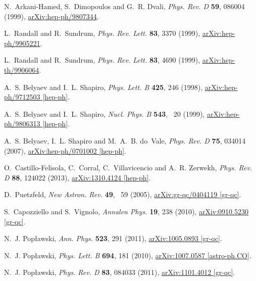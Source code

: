\documentclass{ws-mpla}
\renewcommand{\(}{\left(}
\renewcommand{\)}{\right)}
\renewcommand{\[}{\left[}
\renewcommand{\]}{\right]}
\begin{document}
\begin{thebibliography}{10}
N.~Arkani-Hamed, S.~Dimopoulos and G.~R. Dvali, {\em Phys. Rev. D} {\bf 59},
  086004  (1999), \href{http://arxiv.org/abs/hep-ph/9807344}{{\ttfamily
  arXiv:hep-ph/9807344}}.

L.~Randall and R.~Sundrum, {\em Phys. Rev. Lett.} {\bf 83},   3370  (1999),
  \href{http://arxiv.org/abs/hep-ph/9905221}{{\ttfamily arXiv:hep-ph/9905221}}.

L.~Randall and R.~Sundrum, {\em Phys. Rev. Lett.} {\bf 83},   4690  (1999),
  \href{http://arxiv.org/abs/hep-th/9906064}{{\ttfamily arXiv:hep-th/9906064}}.

A.~S. Belyaev and I.~L. Shapiro, {\em Phys. Lett. B} {\bf 425},   246  (1998),
  \href{http://arxiv.org/abs/hep-ph/9712503}{{\ttfamily arXiv:hep-ph/9712503
  [hep-ph]}}.

A.~S. Belyaev and I.~L. Shapiro, {\em Nucl. Phys. B} {\bf 543},  ~20  (1999),
  \href{http://arxiv.org/abs/hep-ph/9806313}{{\ttfamily arXiv:hep-ph/9806313
  [hep-ph]}}.

A.~S. Belyaev, I.~L. Shapiro and M.~A.~B. do~Vale, {\em Phys. Rev. D} {\bf 75},
    034014  (2007), \href{http://arxiv.org/abs/hep-ph/0701002}{{\ttfamily
  arXiv:hep-ph/0701002 [hep-ph]}}.

O.~Castillo-Felisola, C.~Corral, C.~Villavicencio and A.~R. Zerwekh, {\em Phys.
  Rev. D} {\bf 88},   124022  (2013),
  \href{http://arxiv.org/abs/1310.4124}{{\ttfamily arXiv:1310.4124 [hep-ph]}}.

D.~Puetzfeld, {\em New Astron. Rev.} {\bf 49},  ~59  (2005),
  \href{http://arxiv.org/abs/gr-qc/0404119}{{\ttfamily arXiv:gr-qc/0404119
  [gr-qc]}}.

S.~Capozziello and S.~Vignolo, {\em Annalen Phys.} {\bf 19}, 238  (2010),
  \href{http://arxiv.org/abs/0910.5230}{{\ttfamily arXiv:0910.5230 [gr-qc]}}.

N.~J. Pop{\l}awski, {\em Ann. Phys.} {\bf 523},   291  (2011),
  \href{http://arxiv.org/abs/1005.0893}{{\ttfamily arXiv:1005.0893 [gr-qc]}}.

N.~J. Pop{\l}awski, {\em Phys. Lett. B} {\bf 694},   181  (2010),
  \href{http://arxiv.org/abs/1007.0587}{{\ttfamily arXiv:1007.0587
  [astro-ph.CO]}}.

N.~J. Pop{\l}awski, {\em Phys. Rev. D} {\bf 83},   084033  (2011),
  \href{http://arxiv.org/abs/1101.4012}{{\ttfamily arXiv:1101.4012 [gr-qc]}}.


\end{thebibliography}
\end{document}
